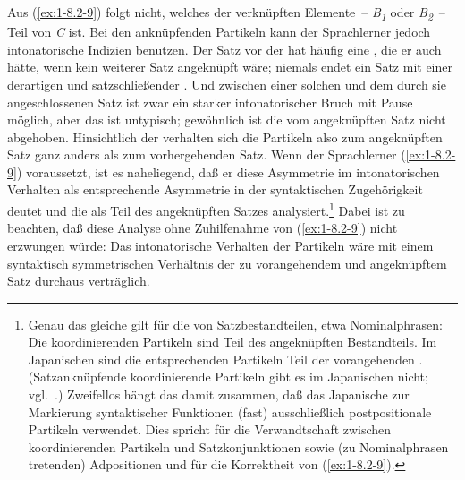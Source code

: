 \documentclass[output=paper]{langsci/langscibook}
\begin{document}
Aus (\ref{ex:1-8.2-9}) folgt nicht, welches der verknüpften Elemente~-- \textit{B\textsubscript{1}} oder \textit{B\textsubscript{2}}~– Teil von \textit{C}
ist. Bei den anknüpfenden Partikeln kann der Sprachlerner jedoch intonatorische Indizien benutzen. Der Satz vor der  hat häufig eine , die er auch hätte, wenn kein weiterer Satz angeknüpft wäre; niemals endet ein Satz mit einer derartigen  und satzschließender . Und zwischen einer solchen 
und dem durch sie angeschlossenen Satz ist zwar ein starker intonatorischer Bruch
mit Pause möglich, aber das ist untypisch; gewöhnlich ist die  vom angeknüpften Satz  nicht abgehoben. Hinsichtlich der  verhalten
sich die Partikeln also zum angeknüpften Satz ganz anders als zum vorhergehenden
Satz. Wenn der Sprachlerner (\ref{ex:1-8.2-9}) voraussetzt, ist es naheliegend, daß er diese
Asymmetrie im intonatorischen Verhalten als entsprechende Asymmetrie in der syntaktischen
Zugehörigkeit deutet und die  als Teil des angeknüpften Satzes analysiert.\footnote{%
  Genau das gleiche gilt für die  von Satzbestandteilen, etwa Nominalphrasen: Die
  koordinierenden Partikeln sind Teil des angeknüpften Bestandteils. Im Japanischen sind die
  entsprechenden Partikeln Teil der vorangehenden . (Satzanknüpfende koordinierende
  Partikeln gibt es im Japanischen nicht; vgl.\ \citet[§8]{Kuno1973}.) Zweifellos hängt das damit
  zusammen, daß das Japanische zur Markierung syntaktischer Funktionen (fast) ausschließlich
  postpositionale Partikeln verwendet. Dies spricht für die Verwandtschaft zwischen koordinierenden
  Partikeln und Satzkonjunktionen sowie (zu Nominalphrasen tretenden) Adpositionen und für die
  Korrektheit von (\ref{ex:1-8.2-9}).%
}
Dabei ist zu beachten, daß diese Analyse ohne Zuhilfenahme von (\ref{ex:1-8.2-9}) nicht
erzwungen würde: Das intonatorische Verhalten der Partikeln wäre mit einem syntaktisch symmetrischen Verhältnis der  zu vorangehendem und angeknüpftem Satz durchaus verträglich.
\end{document}
